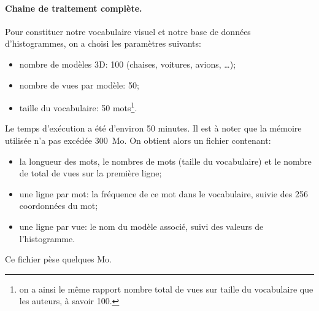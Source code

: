 \documentclass[12pt, a4paper, oneside]{article}
\begin{document}
\paragraph{Chaine de traitement complète.}
Pour constituer notre vocabulaire visuel et notre base de données d'histogrammes, on a choisi les paramètres suivants:
\begin{itemize}
    \item nombre de modèles 3D: 100 (chaises, voitures, avions, \ldots);
    \item nombre de vues par modèle: 50;
    \item taille du vocabulaire: 50 mots\footnote{on a ainsi le même rapport nombre total de vues sur taille du vocabulaire que les auteurs, à savoir 100.}.
\end{itemize}
Le temps d'exécution a été d'environ 50 minutes.
Il est à noter que la mémoire utilisée n'a pas excédée 300~Mo.
On obtient alors un fichier contenant:
\begin{itemize}
    \item la longueur des mots, le nombres de mots (taille du vocabulaire) et le nombre de total de vues sur la première ligne;
    \item une ligne par mot: la fréquence de ce mot dans le vocabulaire, suivie des 256 coordonnées du mot;
    \item une ligne par vue: le nom du modèle associé, suivi des valeurs de l'histogramme.
\end{itemize}
Ce fichier pèse quelques Mo.
\end{document}
